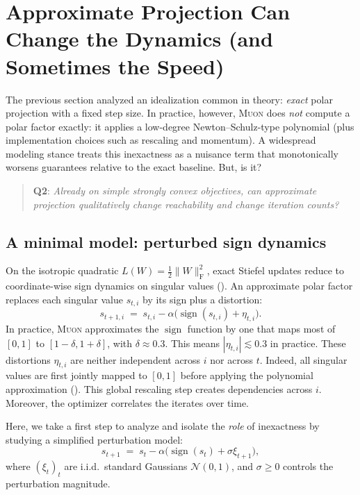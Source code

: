 \documentclass{article}
\theoremstyle{plain}
\theoremstyle{definition}
\theoremstyle{remark}
\newcommand{\loss}{L}
\newcommand{\stepsize}{\alpha}
\newcommand{\sign}{\operatorname{sign}}
\newcommand{\sv}{{s}} %
\newcommand{\Muon}{\textsc{Muon}}
\begin{document}
\section{Approximate Projection Can Change the Dynamics (and Sometimes the Speed)}
\label{sec:noisy}

The previous section analyzed an idealization common in theory:
\emph{exact} polar projection with a fixed step size.
In practice, however, \Muon{} does \emph{not} compute a polar factor exactly: it applies a low-degree Newton--Schulz-type polynomial (plus implementation choices such as rescaling and momentum).
A widespread modeling stance treats this inexactness as a nuisance term that monotonically worsens guarantees relative to the exact baseline.
But, is it?

\begin{quote}
\textbf{Q2}: 
\emph{Already on simple strongly convex objectives, can approximate projection qualitatively change reachability and change iteration counts?}
\end{quote}

\subsection{A minimal model: perturbed sign dynamics}

On the isotropic quadratic $\loss(W)=\tfrac12\|W\|_{\mathrm{F}}^2$, exact Stiefel updates reduce to coordinate-wise sign dynamics on singular values (). 
An approximate polar factor replaces each singular value $\sv_{t,i}$ by 
its sign plus a distortion:
\begin{equation}
  \sv_{t+1,i}
  \;=\;
  \sv_{t,i} - \stepsize\bigl(\sign(\sv_{t,i}) + \eta_{t,i}\bigr).  
  \label{eq:approx-sign-generic}
\end{equation}
In practice, \Muon{} approximates the $\sign$ function %
by one that maps most of $[0,1]$ to $[1-\delta,1+\delta]$, with $\delta\approx0.3$. This means $|\eta_{t,i}| \lesssim 0.3$ in practice. These distortions $\eta_{t,i}$ are neither independent across $i$ nor across $t$. 
Indeed, all singular values are first jointly mapped to $[0,1]$ before applying the polynomial approximation (). 
This global 
rescaling step 
creates dependencies across $i$.
Moreover, the optimizer correlates the iterates over time. 

Here, we take a first step to analyze 
and isolate the \emph{role} of inexactness 
by studying a simplified perturbation model:
\begin{equation}
  \sv_{t+1}
  \;=\;
  \sv_t - \stepsize\bigl(\sign(\sv_t) + \sigma \xi_{t+1}\bigr),
  \label{eq:noisy-sign}
\end{equation}
where $(\xi_t)_t$ are i.i.d.\ standard Gaussians $\mathcal{N}(0,1)$, and $\sigma \geq 0$ controls the perturbation magnitude. 
\end{document}
